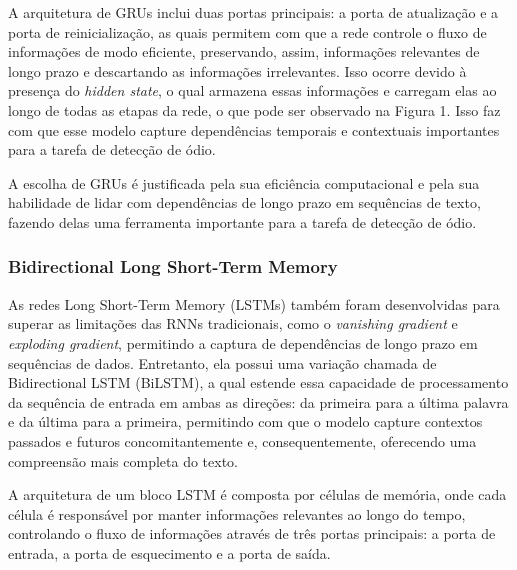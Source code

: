 \documentclass[conference]{IEEEtran}
\begin{document}
\indent A arquitetura de GRUs inclui duas portas principais: a porta de atualização e a porta de reinicialização, as quais permitem com que a rede controle o fluxo de informações de modo eficiente\cite{grum}, preservando, assim, informações relevantes de longo prazo e descartando as informações irrelevantes. Isso ocorre devido à presença do \textit{hidden state}, o qual armazena essas informações e carregam elas ao longo de todas as etapas da rede, o que pode ser observado na Figura 1. Isso faz com que esse modelo capture dependências temporais e contextuais importantes para a tarefa de detecção de ódio.

\indent A escolha de GRUs é justificada pela sua eficiência computacional\cite{d2l} e pela sua habilidade de lidar com dependências de longo prazo em sequências de texto, fazendo delas uma ferramenta importante para a tarefa de detecção de ódio. \\

\subsubsection{Bidirectional Long Short-Term Memory}

\indent As redes Long Short-Term Memory (LSTMs) também foram desenvolvidas para superar as limitações das RNNs tradicionais, como o \textit{vanishing gradient} e \textit{exploding gradient}, permitindo a captura de dependências de longo prazo em sequências de dados. Entretanto, ela possui uma variação chamada de Bidirectional LSTM (BiLSTM), a qual estende essa capacidade de processamento da sequência de entrada em ambas as direções: da primeira para a última palavra e da última para a primeira\cite{geeks}, permitindo com que o modelo capture contextos passados e futuros concomitantemente e, consequentemente, oferecendo uma compreensão mais completa do texto.

A arquitetura de um bloco LSTM é composta por células de memória, onde cada célula é responsável por manter informações relevantes ao longo do tempo, controlando o fluxo de informações através de três portas principais: a porta de entrada, a porta de esquecimento e a porta de saída.
\end{document}
